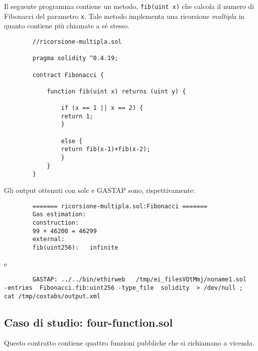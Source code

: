         Il seguente programma contiene un metodo, \verb|fib(uint x)| che calcola il numero di Fibonacci del parametro \verb|x|. Tale metodo implementa una ricorsione \emph{multipla} in quanto contiene più chiamate a sé stesso.\newline
        
        \begin{minipage}{\linewidth}
        \begin{lstlisting}
        //ricorsione-multipla.sol

        pragma solidity ^0.4.19;

        contract Fibonacci {

            function fib(uint x) returns (uint y) {
            
                if (x == 1 || x == 2) {
                return 1;
                }
                
                else {
                return fib(x-1)+fib(x-2);
                }
            }
        }
        \end{lstlisting}
        \end{minipage}
        
        Gli output ottenuti con solc e GASTAP sono, rispettivamente:
        
        \begin{minipage}{\linewidth}
        \begin{lstlisting}
        ======= ricorsione-multipla.sol:Fibonacci =======
        Gas estimation:
        construction:
        99 + 46200 = 46299
        external:
        fib(uint256):	infinite
        \end{lstlisting}
        \end{minipage}

        e
    
        \begin{lstlisting}
        GASTAP: ../../bin/ethirweb   /tmp/ei_filesVQtMmj/noname1.sol  -entries  Fibonacci.fib:uint256 -type_file  solidity  > /dev/null ; cat /tmp/costabs/output.xml         
        \end{lstlisting}
        
     
    \newpage
     
    \subsection{Caso di studio: four-function.sol}
    
    Questo contratto contiene quattro funzioni pubbliche che si richiamano a vicenda. 
    
